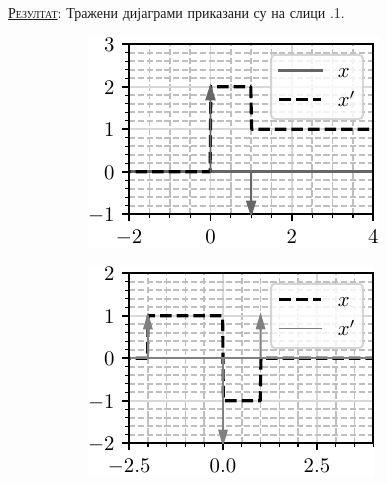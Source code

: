 \textsc{\underline{Резултат}}: 
Тражени дијаграми приказани су 
на слици \ID.1. \\
\begin{figure}[ht!]
    \hspace*{0pt}\hfill
    \begin{subfigure}[c]{0.45\textwidth}
        \centering
        \includegraphics[scale=1]{fig/crtaj_ct_a.pdf}
        \caption{}
    \end{subfigure}
    \hspace*{0pt}\hfill
    \begin{subfigure}[c]{0.45\textwidth}
        \centering
        \includegraphics[scale=1]{fig/crtaj_ct_b.pdf}
        \caption{}
    \end{subfigure}
    \hfill
    \hspace*{0pt}


\end{figure}
